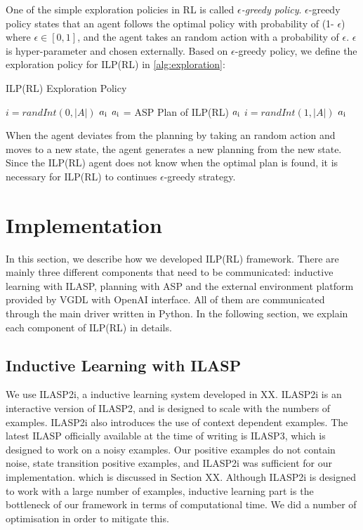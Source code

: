 One of the simple exploration policies in RL is called \textit{$\epsilon$-greedy policy}.
$\epsilon$-greedy policy states that an agent follows the optimal policy with probability of (1- $\epsilon$) where $\epsilon \in [0,1]$, 
and the agent takes an random action with a probability of $\epsilon$. $\epsilon$ is hyper-parameter and chosen externally.
Based on $\epsilon$-greedy policy, we define the exploration policy for ILP(RL) in \ref{alg:exploration}:
\begin{algorithm}[!htb]
\caption{ILP(RL) Exploration Policy}
\begin{algorithmic}[1]
\label{alg:exploration}
\State
{}
\space
\State
{}
\State $i = randInt(0, |A|)$ 
\Return $a\textsubscript{i}$
\Else \State $a\textsubscript{i}$ = ASP Plan of ILP(RL)
\Return $a\textsubscript{i}$
\EndIf
\Else \State $i = randInt(1, |A|)$
\Return $a\textsubscript{i}$
\EndIf
\EndProcedure
\end{algorithmic}
\end{algorithm}
When the agent deviates from the planning by taking an random action and moves to a new state, the agent generates a new planning from the new state. 
Since the ILP(RL) agent does not know when the optimal plan is found, it is necessary for ILP(RL) to continues $\epsilon$-greedy strategy.

\section{Implementation}
\label{Implementation}
In this section, we describe how we developed ILP(RL) framework.
There are mainly three different components that need to be communicated: inductive learning with ILASP, planning with ASP and the external environment platform provided by VGDL with OpenAI interface.
All of them are communicated through the main driver written in Python. 
In the following section, we explain each component of ILP(RL) in details.

\subsection{Inductive Learning with ILASP}
We use ILASP2i, a inductive learning system developed in XX. 
ILASP2i is an interactive version of ILASP2, and is designed to scale with the numbers of examples. 
ILASP2i also introduces the use of context dependent examples.
The latest ILASP officially available at the time of writing is ILASP3, which is designed to work on a noisy examples. 
Our positive examples do not contain noise, state transition positive examples, and ILASP2i was sufficient for our implementation.
which is discussed in Section XX. 
Although ILASP2i is designed to work with a large number of examples, inductive learning part is the bottleneck of our framework in terms of computational time. 
We did a number of optimisation in order to mitigate this. 

